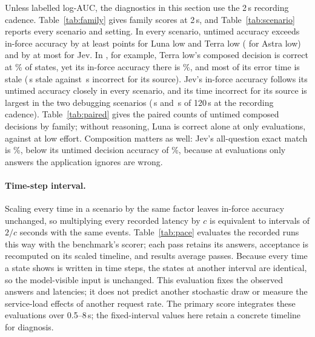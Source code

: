 Unless labelled log-AUC, the diagnostics in this section use the 2\,s recording cadence.
Table~\ref{tab:family} gives family scores at 2\,s, and Table~\ref{tab:scenario} reports every scenario and setting.
In every scenario, untimed accuracy exceeds in-force accuracy by at least \GPTMinScenarioGap{} points for Luna low and Terra low (\AstraMinScenarioGap{} for Astra low) and by at most \JevMaxScenarioGap{} for Jev.
In \emph{\SupportBTitle}, for example, Terra low's composed decision is correct at \TerraSupportBUntimed\% of states, yet its in-force accuracy there is \TerraSupportBInForce\%, and most of its error time is stale (\TerraSupportBErrStaleSec\,s stale against \TerraSupportBErrIncorrectSec\,s incorrect for its source).
Jev's in-force accuracy follows its untimed accuracy closely in every scenario, and its time incorrect for its source is largest in the two debugging scenarios (\JevDebugAErrIncorrectSec\,s and \JevDebugBErrIncorrectSec\,s of 120\,s at the recording cadence).
Table~\ref{tab:paired} gives the paired counts of untimed composed decisions by family; without reasoning, Luna is correct alone at only \PairLunaNoneLunaLunaNoneOnly{} evaluations, against \PairLunaNoneLunaLunaOnly{} at low effort.
Composition matters as well: Jev's all-question exact match is \JevExactMatch\%, below its untimed decision accuracy of \JevUntimed\%, because at \JevInactiveOnlyErrors{} evaluations only answers the application ignores are wrong.

\paragraph{Time-step interval.}
Scaling every time in a scenario by the same factor leaves in-force accuracy unchanged, so multiplying every recorded latency by $c$ is equivalent to intervals of $2/c$ seconds with the same events.
Table~\ref{tab:pace} evaluates the recorded runs this way with the benchmark's scorer; each pass retains its answers, acceptance is recomputed on its scaled timeline, and results average passes.
Because every time a state shows is written in time steps, the states at another interval are identical, so the model-visible input is unchanged. This evaluation fixes the observed answers and latencies; it does not predict another stochastic draw or measure the service-load effects of another request rate.
The primary score integrates these evaluations over 0.5--8\,s; the fixed-interval values here retain a concrete timeline for diagnosis.

\FloatBarrier
